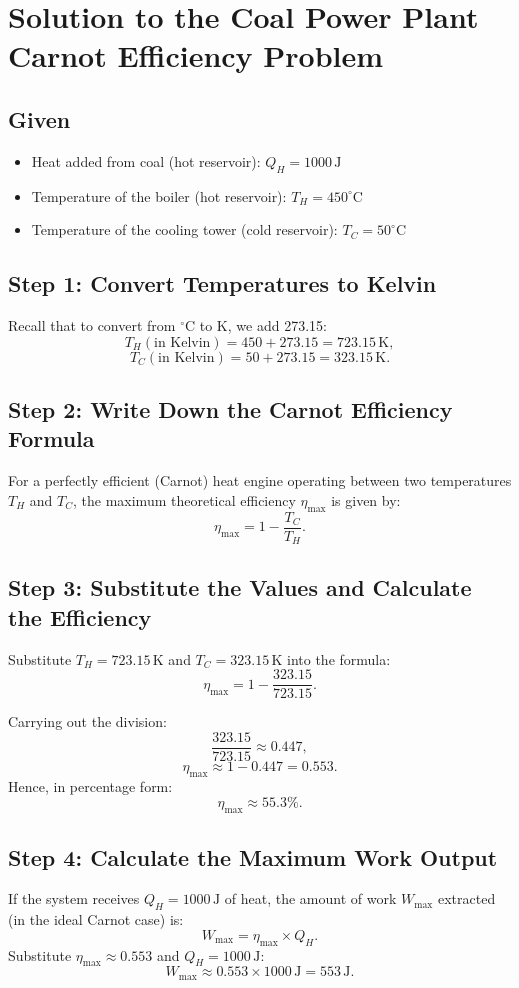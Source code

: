 \documentclass[12pt]{article}
\theoremstyle{definition} %
\theoremstyle{plain} %
\begin{document}
\section*{Solution to the Coal Power Plant Carnot Efficiency Problem}

\subsection*{Given}
\begin{itemize}
    \item Heat added from coal (hot reservoir): $Q_{H} = 1000\,\text{J}$
    \item Temperature of the boiler (hot reservoir): $T_{H} = 450^\circ\text{C}$
    \item Temperature of the cooling tower (cold reservoir): $T_{C} = 50^\circ\text{C}$
\end{itemize}

\subsection*{Step 1: Convert Temperatures to Kelvin}
Recall that to convert from $^\circ\text{C}$ to K, we add 273.15:
\[
T_{H} (\text{in Kelvin}) = 450 + 273.15 = 723.15\,\text{K},
\]
\[
T_{C} (\text{in Kelvin}) = 50 + 273.15 = 323.15\,\text{K}.
\]

\subsection*{Step 2: Write Down the Carnot Efficiency Formula}
For a perfectly efficient (Carnot) heat engine operating between two temperatures $T_{H}$ and $T_{C}$, the maximum theoretical efficiency $\eta_{\mathrm{max}}$ is given by:
\[
\eta_{\mathrm{max}} = 1 - \frac{T_{C}}{T_{H}}.
\]

\subsection*{Step 3: Substitute the Values and Calculate the Efficiency}
Substitute $T_{H} = 723.15\,\text{K}$ and $T_{C} = 323.15\,\text{K}$ into the formula:
\[
\eta_{\mathrm{max}} 
= 1 - \frac{323.15}{723.15}.
\]

Carrying out the division:
\[
\frac{323.15}{723.15} \approx 0.447,
\]
\[
\eta_{\mathrm{max}} \approx 1 - 0.447 = 0.553.
\]
Hence, in percentage form:
\[
\eta_{\mathrm{max}} \approx 55.3\%.
\]

\subsection*{Step 4: Calculate the Maximum Work Output}
If the system receives $Q_{H} = 1000\,\text{J}$ of heat, the amount of work $W_{\mathrm{max}}$ extracted (in the ideal Carnot case) is:
\[
W_{\mathrm{max}} = \eta_{\mathrm{max}} \times Q_{H}.
\]
Substitute $\eta_{\mathrm{max}} \approx 0.553$ and $Q_{H} = 1000\,\text{J}$:
\[
W_{\mathrm{max}} \approx 0.553 \times 1000\,\text{J} = 553\,\text{J}.
\]
\end{document}
